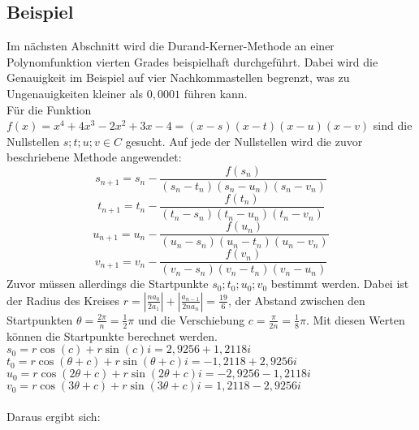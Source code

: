\documentclass[12pt]{article}
\begin{document}
    \subsection{Beispiel}
        Im nächsten Abschnitt wird die Durand-Kerner-Methode an einer Polynomfunktion vierten Grades beispielhaft durchgeführt. Dabei wird die Genauigkeit im Beispiel auf vier Nachkommastellen begrenzt, was zu Ungenauigkeiten kleiner als $0,0001$ führen kann. \\
        Für die Funktion $f(x) = x^4 + 4x^3 - 2x^2 + 3x - 4 = (x-s)(x-t)(x-u)(x-v)$ sind die Nullstellen $s;t;u;v \in C$ gesucht. Auf jede der Nullstellen wird die zuvor beschriebene Methode angewendet:
        \begin{displaymath}
            s_{n+1} = s_n-\frac{f(s_n)}{(s_n-t_n)(s_n-u_n)(s_n-v_n)}
        \end{displaymath}
        \begin{displaymath}
            t_{n+1} = t_n-\frac{f(t_n)}{(t_n-s_n)(t_n-u_n)(t_n-v_n)}
        \end{displaymath}
        \begin{displaymath}
            u_{n+1} = u_n-\frac{f(u_n)}{(u_n-s_n)(u_n-t_n)(u_n-v_n)}
        \end{displaymath}
        \begin{displaymath}
            v_{n+1} = v_n-\frac{f(v_n)}{(v_n-s_n)(v_n-t_n)(v_n-u_n)}
        \end{displaymath}
        Zuvor müssen allerdings die Startpunkte $s_0;t_0;u_0;v_0$ bestimmt werden. Dabei ist der Radius des Kreises $r = |\frac{na_0}{2a_1}| + |\frac{a_{n-1}}{2na_n}| = \frac{19}{6}$, der Abstand zwischen den Startpunkten $\theta = \frac{2\pi}{n} = \frac{1}{2}\pi$ und die Verschiebung $c = \frac{\pi}{2n} = \frac{1}{8}\pi$. Mit diesen Werten können die Startpunkte berechnet werden. \\
        $s_0 = r \cos(c) + r \sin(c)i = 2,9256 + 1,2118i$ \\
        $t_0 = r \cos(\theta+c) + r \sin(\theta+c)i = -1,2118 + 2,9256i$ \\
        $u_0 = r \cos(2\theta+c) + r \sin(2\theta+c)i = -2,9256 - 1,2118i$ \\
        $v_0 = r \cos(3\theta+c) + r \sin(3\theta+c)i = 1,2118 - 2,9256i$ \\\\
        Daraus ergibt sich:
\end{document}
